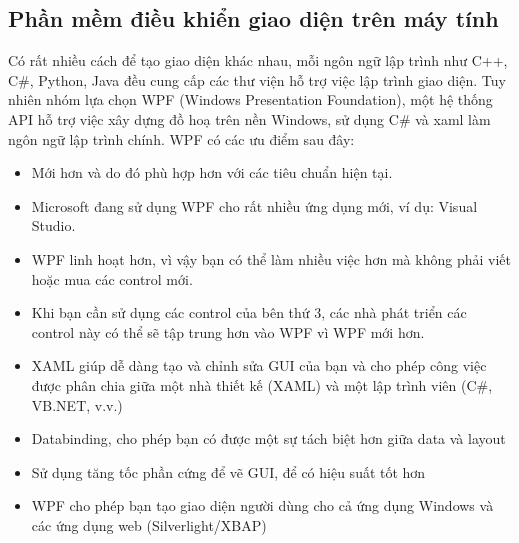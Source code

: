 \subsection{Phần mềm điều khiển giao diện trên máy tính}
Có rất nhiều cách để tạo giao diện khác nhau, mỗi ngôn ngữ lập trình như C++, C\#, Python, Java đều cung cấp các thư viện hỗ trợ việc lập trình giao diện. Tuy nhiên nhóm lựa chọn WPF (Windows Presentation Foundation), một hệ thống API hỗ trợ việc xây dựng đồ hoạ trên nền Windows, sử dụng C\# và xaml làm ngôn ngữ lập trình chính. WPF có các ưu điểm sau đây:
\begin{itemize}
\item Mới hơn và do đó phù hợp hơn với các tiêu chuẩn hiện tại.
\item Microsoft đang sử dụng WPF cho rất nhiều ứng dụng mới, ví dụ: Visual Studio.
\item WPF linh hoạt hơn, vì vậy bạn có thể làm nhiều việc hơn mà không phải viết hoặc mua các control mới.
\item Khi bạn cần sử dụng các control của bên thứ 3, các nhà phát triển các control này có thể sẽ tập trung hơn vào WPF vì WPF mới hơn.
\item XAML giúp dễ dàng tạo và chỉnh sửa GUI của bạn và cho phép công việc được phân chia giữa một nhà thiết kế (XAML) và một lập trình viên (C\#, VB.NET, v.v.)
\item Databinding, cho phép bạn có được một sự tách biệt hơn giữa data và layout
\item Sử dụng tăng tốc phần cứng để vẽ GUI, để có hiệu suất tốt hơn
\item WPF cho phép bạn tạo giao diện người dùng cho cả ứng dụng Windows và các ứng dụng web (Silverlight/XBAP)
\end{itemize}
